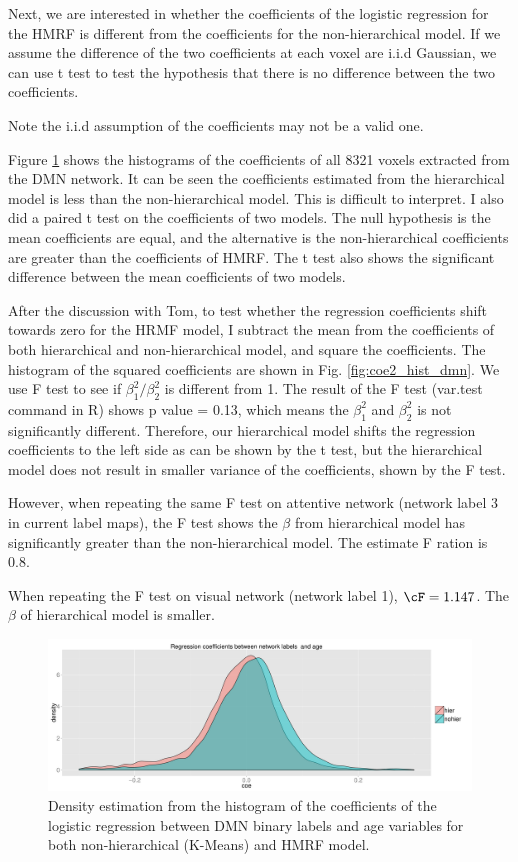 \documentclass[12pt]{article}
\begin{document}
Next, we are interested in whether the coefficients of the logistic regression
for the HMRF is different from the coefficients for the non-hierarchical
model. If we assume the difference of the two coefficients at each voxel are
i.i.d Gaussian, we can use t test to test the hypothesis that there is no
difference between the two coefficients.

Note the i.i.d assumption of the coefficients may not be a valid one. 

Figure \ref{fig:coe_density_dmn} shows the histograms of the coefficients of all
8321 voxels extracted from the DMN network. It can be seen the coefficients
estimated from the hierarchical model is less than the non-hierarchical
model. This is difficult to interpret. I also did a paired t test on the
coefficients of two models. The null hypothesis is the mean coefficients are
equal, and the alternative is the non-hierarchical coefficients are greater than
the coefficients of HMRF. The t test also shows the significant difference
between the mean coefficients of two models.

After the discussion with Tom, to test whether the regression coefficients shift
towards zero for the HRMF model, I subtract the mean from the coefficients of
both hierarchical and non-hierarchical model, and square the coefficients. The
histogram of the squared coefficients are shown in Fig.
\ref{fig:coe2_hist_dmn}. We use F test to see if $\beta_1^2 / \beta_2^2$ is
different from 1. The result of the F test (\textsf{var.test} command in R)
shows p value = 0.13, which means the $\beta_1^2$ and $\beta_2^2$ is not
significantly different. Therefore, our hierarchical model shifts the regression
coefficients to the left side as can be shown by the t test, but the
hierarchical model does not result in smaller variance of the coefficients,
shown by the F test.

However, when repeating the same F test on attentive network (network label 3 in
current label maps), the F test shows the $\beta$ from hierarchical model has
significantly greater than the non-hierarchical model. The estimate F ration is
0.8.

When repeating the F test on visual network (network label 1), $\cF =
1.147$. The $\beta$ of hierarchical model is smaller.

\begin{figure}[htb]
  \centering
  \includegraphics[width = 1.0\textwidth]{figures/coe_density_dmn}
  \caption{ Density estimation from the histogram of the coefficients of the
    logistic regression between DMN binary labels and \textsf{age} variables for
    both non-hierarchical (K-Means) and HMRF model.}
  \label{fig:coe_density_dmn}
\end{figure}
\end{document}
